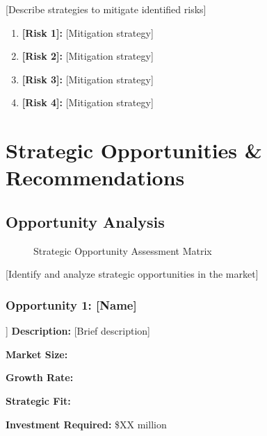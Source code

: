 \documentclass[11pt,letterpaper]{report}
\begin{document}
[Describe strategies to mitigate identified risks]

\begin{riskbox}
\begin{enumerate}
    \item \textbf{[Risk 1]:} [Mitigation strategy]
    \item \textbf{[Risk 2]:} [Mitigation strategy]
    \item \textbf{[Risk 3]:} [Mitigation strategy]
    \item \textbf{[Risk 4]:} [Mitigation strategy]
\end{enumerate}
\end{riskbox}

\chapter{Strategic Opportunities \& Recommendations}

\section{Opportunity Analysis}


\begin{figure}[htbp]
\centering
\caption{Strategic Opportunity Assessment Matrix}
\label{fig:opportunity_matrix}
\end{figure}

[Identify and analyze strategic opportunities in the market]

\subsection{Opportunity 1: [Name]}
\begin{opportunitybox}[Opportunity: [Name]]
\textbf{Description:} [Brief description]

\textbf{Market Size:} 

\textbf{Growth Rate:} 

\textbf{Strategic Fit:} 

\textbf{Investment Required:} \$XX million
\end{opportunitybox}
\end{document}
